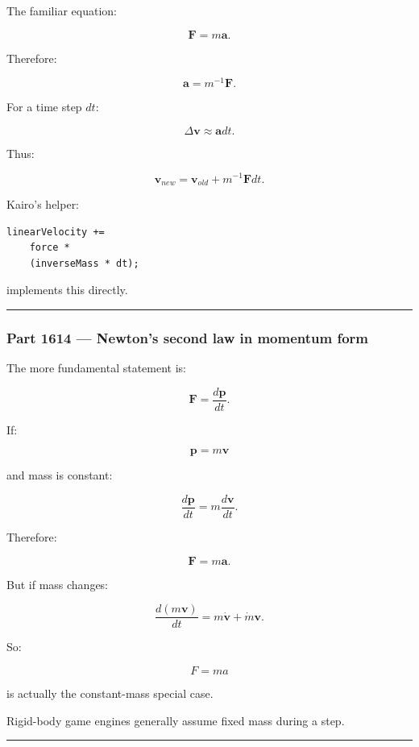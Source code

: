 The familiar equation:

\[
\boxed{
\mathbf{F}=m\mathbf{a}.
}
\]

Therefore:

\[
\mathbf{a}
=
m^{-1}\mathbf{F}.
\]

For a time step \(dt\):

\[
\Delta\mathbf{v}
\approx
\mathbf{a}dt.
\]

Thus:

\[
\boxed{
\mathbf{v}_{new}
=
\mathbf{v}_{old}
+
m^{-1}\mathbf{F}dt.
}
\]

Kairo's helper:

\begin{verbatim}
linearVelocity +=
    force *
    (inverseMass * dt);
\end{verbatim}

implements this directly.

\begin{center}\rule{0.5\linewidth}{0.5pt}\end{center}

\subsubsection{Part 1614 --- Newton's second law in momentum form}\label{part-1614-newtons-second-law-in-momentum-form}

The more fundamental statement is:

\[
\boxed{
\mathbf{F}
=
\frac{d\mathbf{p}}{dt}.
}
\]

If:

\[
\mathbf{p}=m\mathbf{v}
\]

and mass is constant:

\[
\frac{d\mathbf{p}}{dt}
=
m\frac{d\mathbf{v}}{dt}.
\]

Therefore:

\[
\mathbf{F}
=
m\mathbf{a}.
\]

But if mass changes:

\[
\frac{d(m\mathbf{v})}{dt}
=
m\dot{\mathbf{v}}
+
\dot m\mathbf{v}.
\]

So:

\[
F=ma
\]

is actually the constant-mass special case.

Rigid-body game engines generally assume fixed mass during a step.

\begin{center}\rule{0.5\linewidth}{0.5pt}\end{center}

